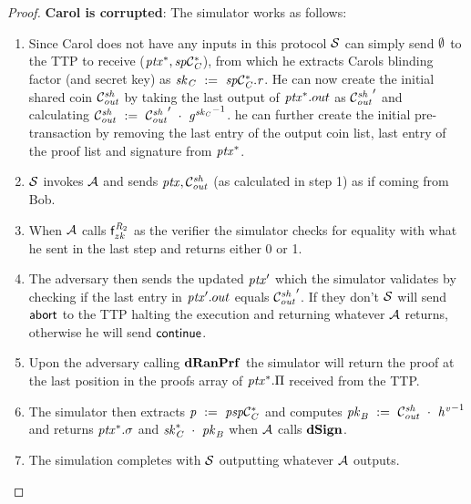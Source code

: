 \begin{proof}
    \textbf{Carol is corrupted}: The simulator works as follows:
    \begin{enumerate}
        \item Since Carol does not have any inputs in this protocol $\mathcal{S}$ can simply send $\emptyset$ to the TTP to receive ($\mathit{ptx}^*, \mathit{sp}\mathcal{C}_{\mathit{C}}^*$), from which he extracts Carols blinding factor (and secret key) as $\mathit{sk}_{\mathit{C}} ~:=~ \mathit{sp}\mathcal{C}_{\mathit{C}}^*.\mathit{r}$.
        He can now create the initial shared coin $\mathcal{C}_{\mathit{out}}^{\mathit{sh}}$ by taking the last output of $\mathit{ptx}^*.out$ as ${\mathcal{C}_{\mathit{out}}^{\mathit{sh}}}'$ and calculating $\mathcal{C}_{\mathit{out}}^{\mathit{sh}} ~:=~ {\mathcal{C}_{\mathit{out}}^{\mathit{sh}}}' ~\cdot~ {\mathit{g}^{\mathit{sk}_{\mathit{C}}}}^{-1}$.
        he can further create the initial pre-transaction by removing the last entry of the output coin list, last entry of the proof list and signature from $\mathit{ptx}^*$.
        \item $\mathcal{S}$ invokes $\mathcal{A}$ and sends $\mathit{ptx}, \mathcal{C}_{\mathit{out}}^{\mathit{sh}}$ (as calculated in step 1) as if coming from Bob.
        \item When $\mathcal{A}$ calls $\mathsf{f}^{\mathit{R}_2}_{zk}$ as the verifier the simulator checks for equality with what he sent in the last step and returns either 0 or 1.
        \item The adversary then sends the updated ${\mathit{ptx}}'$ which the simulator validates by checking if the last entry in ${\mathit{ptx}}'.out$ equals ${\mathcal{C}_{\mathit{out}}^{\mathit{sh}}}'$.
        If they don't $\mathcal{S}$ will send $\mathsf{abort}$ to the TTP halting the execution and returning whatever $\mathcal{A}$ returns, otherwise he will send $\mathsf{continue}$.
        \item Upon the adversary calling $\mathbf{dRanPrf}$ the simulator will return the proof at the last position in the proofs array of $\mathit{ptx}^*.\Pi$ received from the TTP.
        \item The simulator then extracts $\mathit{p} ~:=~ \mathit{psp}\mathcal{C}_{\mathit{C}}^*$ and computes $\mathit{pk}_{\mathit{B}} ~:=~ \mathcal{C}_{\mathit{out}}^{\mathit{sh}} ~\cdot~ {\mathit{h}^{\mathit{v}}}^{-1}$ and returns $\mathit{ptx}^*.\sigma$ and $\mathit{sk}_{\mathit{C}}^* ~\cdot~ \mathit{pk}_{\mathit{B}}$ when $\mathcal{A}$ calls $\mathbf{dSign}$.
        \item The simulation completes with $\mathcal{S}$ outputting whatever $\mathcal{A}$ outputs.
    \end{enumerate}


\end{proof}
